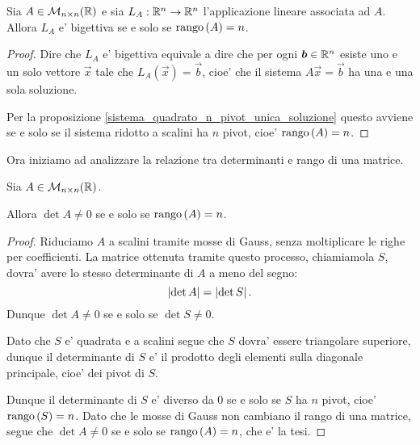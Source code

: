 \begin{proposition}
    Sia $A \in \mathcal{M}_{n \times n}(\mathbb{R})$ e sia $L_A : \mathbb{R}^n \to \mathbb{R}^n$ l'applicazione lineare associata ad $A$. Allora $L_A$ e' bigettiva se e solo se $\operatorname{rango}\left( A \right) = n$.
\end{proposition}
\begin{proof}
    Dire che $L_A$ e' bigettiva equivale a dire che per ogni $\bm{b} \in \mathbb{R}^n$ esiste uno e un solo vettore $\vec x$ tale che $L_A(\vec x) = \vec b$, cioe' che il sistema $A\vec x = \vec b$ ha una e una sola soluzione.

    Per la proposizione \ref{sistema_quadrato_n_pivot_unica_soluzione} questo avviene se e solo se il sistema ridotto a scalini ha $n$ pivot, cioe' $\operatorname{rango}\left( A \right) = n$. 
\end{proof}

Ora iniziamo ad analizzare la relazione tra determinanti e rango di una matrice.

\begin{theorem}\label{det_nonnullo_sse_rango_n}
    Sia $A \in \mathcal{M}_{n \times n}(\mathbb{R})$. 
    
    Allora $\det A \neq 0$ se e solo se $\operatorname{rango}\left( A \right) = n$.
\end{theorem}
\begin{proof}
    Riduciamo $A$ a scalini tramite mosse di Gauss, senza moltiplicare le righe per coefficienti. La matrice ottenuta tramite questo processo, chiamiamola $S$, dovra' avere lo stesso determinante di $A$ a meno del segno: \[
        \left|\det A\right| = \left|\det S\right|.
    \] Dunque $\det A \neq 0$ se e solo se $\det S \neq 0$. 
    
    Dato che $S$ e' quadrata e a scalini segue che $S$ dovra' essere triangolare superiore, dunque il determinante di $S$ e' il prodotto degli elementi sulla diagonale principale, cioe' dei pivot di $S$.
    
    Dunque il determinante di $S$ e' diverso da $0$ se e solo se $S$ ha $n$ pivot, cioe' $\operatorname{rango}\left( S \right) = n$. Dato che le mosse di Gauss non cambiano il rango di una matrice, segue che $\det A \neq 0$ se e solo se $\operatorname{rango}\left( A \right) = n$, che e' la tesi.
\end{proof}

